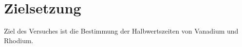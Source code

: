 \section{Zielsetzung}
\label{sec:Ziel}
Ziel des Versuches ist die Bestimmung der Halbwertszeiten von Vanadium und Rhodium.
